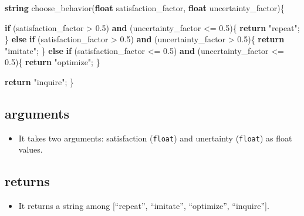 \documentclass[]{book}
\newenvironment{Shaded}{\begin{snugshade}}{\end{snugshade}}
\newcommand{\FloatTok}[1]{\textcolor[rgb]{0.00,0.00,0.81}{#1}}
\newcommand{\KeywordTok}[1]{\textcolor[rgb]{0.13,0.29,0.53}{\textbf{#1}}}
\newcommand{\NormalTok}[1]{#1}
\newcommand{\OtherTok}[1]{\textcolor[rgb]{0.56,0.35,0.01}{#1}}
\newcommand{\StringTok}[1]{\textcolor[rgb]{0.31,0.60,0.02}{#1}}
\providecommand{\tightlist}{%
  \setlength{\itemsep}{0pt}\setlength{\parskip}{0pt}}
\theoremstyle{definition}
\theoremstyle{definition}
\theoremstyle{definition}
\theoremstyle{remark}
\begin{document}
\begin{Shaded}
\begin{Highlighting}[]
\KeywordTok{string}\NormalTok{ choose_behavior}\OtherTok{(}\KeywordTok{float}\NormalTok{ satisfaction_factor}\OtherTok{,} \KeywordTok{float}\NormalTok{ uncertainty_factor}\OtherTok{)}\NormalTok{\{}

        \KeywordTok{if} \OtherTok{(}\NormalTok{satisfaction_factor > }\FloatTok{0.5}\OtherTok{)} \KeywordTok{and} \OtherTok{(}\NormalTok{uncertainty_factor <= }\FloatTok{0.5}\OtherTok{)}\NormalTok{\{}
            \KeywordTok{return} \StringTok{"repeat"}\OtherTok{;}
\NormalTok{        \} }\KeywordTok{else} \KeywordTok{if} \OtherTok{(}\NormalTok{satisfaction_factor > }\FloatTok{0.5}\OtherTok{)} \KeywordTok{and} \OtherTok{(}\NormalTok{uncertainty_factor > }\FloatTok{0.5}\OtherTok{)}\NormalTok{\{}
            \KeywordTok{return} \StringTok{"imitate"}\OtherTok{;}
\NormalTok{        \} }\KeywordTok{else} \KeywordTok{if} \OtherTok{(}\NormalTok{satisfaction_factor <= }\FloatTok{0.5}\OtherTok{)} \KeywordTok{and} \OtherTok{(}\NormalTok{uncertainty_factor <= }\FloatTok{0.5}\OtherTok{)}\NormalTok{\{}
            \KeywordTok{return} \StringTok{"optimize"}\OtherTok{;}
\NormalTok{        \}}
                    
        \KeywordTok{return} \StringTok{"inquire"}\OtherTok{;}
\NormalTok{    \}}
\end{Highlighting}
\end{Shaded}

\hypertarget{arguments-3}{%
\subsection*{arguments}\label{arguments-3}}

\begin{itemize}
\tightlist
\item
  It takes two arguments: satisfaction (\texttt{float}) and unertainty
  (\texttt{float}) as float values.
\end{itemize}

\hypertarget{returns-3}{%
\subsection*{returns}\label{returns-3}}

\begin{itemize}
\tightlist
\item
  It returns a string among {[}``repeat'', ``imitate'', ``optimize'',
  ``inquire''{]}.
\end{itemize}
\end{document}
